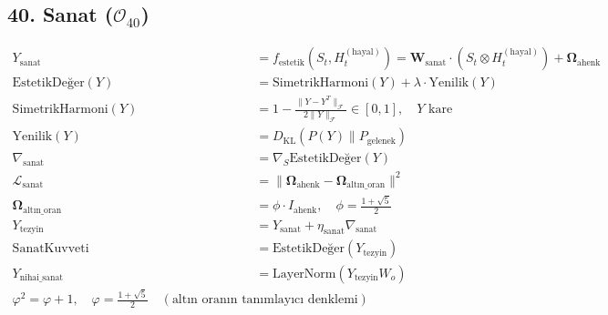 \documentclass[11pt, a4paper]{article}
\begin{document}
\subsection{40. Sanat ($\mathcal{O}_{40}$)}
\begin{align}
Y_{\text{sanat}} &= f_{\text{estetik}}(S_t, H_t^{(\text{hayal})}) = \mathbf{W}_{\text{sanat}} \cdot \left( S_t \otimes H_t^{(\text{hayal})} \right) + \mathbf{\Omega}_{\text{ahenk}} \\
\text{EstetikDeğer}(Y) &= \text{SimetrikHarmoni}(Y) + \lambda \cdot \text{Yenilik}(Y) \\
\text{SimetrikHarmoni}(Y) &= 1 - \frac{\| Y - Y^T \|_{\mathcal{F}}}{2\|Y\|_{\mathcal{F}}} \in [0,1], \quad Y \text{ kare} \\
\text{Yenilik}(Y) &= D_{\text{KL}}(P(Y) \parallel P_{\text{gelenek}}) \\
\nabla_{\text{sanat}} &= \nabla_S \text{EstetikDeğer}(Y) \\
\mathcal{L}_{\text{sanat}} &= \|\mathbf{\Omega}_{\text{ahenk}} - \mathbf{\Omega}_{\text{altın\_oran}}\|^2 \\
\mathbf{\Omega}_{\text{altın\_oran}} &= \phi \cdot I_{\text{ahenk}}, \quad \phi = \frac{1+\sqrt{5}}{2} \\
Y_{\text{tezyin}} &= Y_{\text{sanat}} + \eta_{\text{sanat}} \nabla_{\text{sanat}} \\
\text{SanatKuvveti} &= \text{EstetikDeğer}(Y_{\text{tezyin}}) \\
Y_{\text{nihai\_sanat}} &= \text{LayerNorm}(Y_{\text{tezyin}} W_o) \\
\varphi^2 = \varphi + 1, \quad \varphi = \tfrac{1+\sqrt{5}}{2} \quad (\text{altın oranın tanımlayıcı denklemi})
\end{align}
\end{document}
